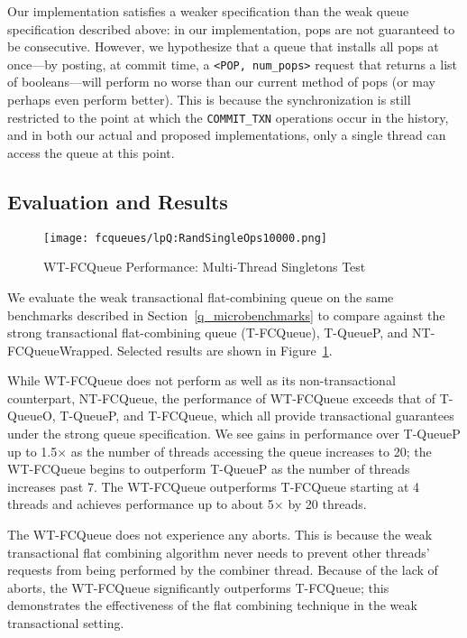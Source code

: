 Our implementation satisfies a weaker specification than the weak queue specification described above: in our implementation, pops are not guaranteed to be consecutive. However, we hypothesize that a queue that installs all pops at once---by posting, at commit time, a \texttt{<POP, num\_pops>} request that returns a list of booleans---will perform no worse than our current method of pops (or may perhaps even perform better). This is because the synchronization is still restricted to the point at which the \texttt{COMMIT\_TXN} operations occur in the history, and in both our actual and proposed implementations, only a single thread can access the queue at this point.

\subsection{Evaluation and Results}

\begin{figure}[t]
    \centering
    {\texttt{[image: fcqueues/lpQ:RandSingleOps10000.png]}}
    \caption{WT-FCQueue Performance: Multi-Thread Singletons Test}
    \label{fig:wtqs}
\end{figure}

We evaluate the weak transactional flat-combining queue on the same benchmarks described in Section~\ref{q_microbenchmarks} to compare against the strong transactional flat-combining queue (T-FCQueue), T-QueueP, and NT-FCQueueWrapped. Selected results are shown in Figure~\ref{fig:wtqs}.

While WT-FCQueue does not perform as well as its non-transactional counterpart, NT-FCQueue, the performance of WT-FCQueue exceeds that of T-QueueO, T-QueueP, and T-FCQueue, which all provide transactional guarantees under the strong queue specification. We see gains in performance over T-QueueP up to 1.5$\times$ as the number of threads accessing the queue increases to 20; the WT-FCQueue begins to outperform T-QueueP as the number of threads increases past 7. The WT-FCQueue outperforms T-FCQueue starting at 4 threads and achieves performance up to about 5$\times$ by 20 threads.
 
The WT-FCQueue does not experience any aborts. This is because the weak transactional flat combining algorithm never needs to prevent other threads' requests from being performed by the combiner thread. Because of the lack of aborts, the WT-FCQueue significantly outperforms T-FCQueue; this demonstrates the effectiveness of the flat combining technique in the weak transactional setting. 

